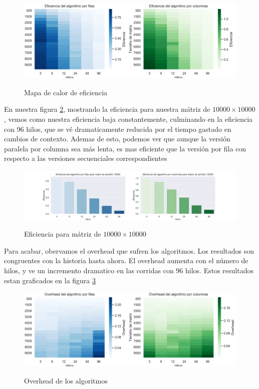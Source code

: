 \documentclass{report}
\begin{document}
\begin{figure}[H]
    \centering
  \caption{Mapa de calor de eficiencia}
\includegraphics[width=\textwidth]{stars_eff}
\label{fig:stareff}
\end{figure}

En nuestra figura \ref{fig:stareffbar}, mostrando la eficiencia para nuestra mátriz
de $10000 \times 10000$, vemos como nuestra eficiencia baja constantemente,
culminando en la eficiencia con 96 hilos, que se vé dramaticamente reducida por el
tiempo gastado en cambios de contexto. Ademas de esto, podemos ver que aunque la
versión paralela por columna sea más lenta, es mas eficiente que la versión por
fila con respecto a las versiones secuenciales correspondientes

\begin{figure}[H]
    \centering
  \caption{Eficiencia para mátriz de $10000 \times 10000$}
  \includegraphics[width=\textwidth]{stars_eff_bar}
\label{fig:stareffbar}
\end{figure}

Para acabar, obervamos el overhead que sufren los algoritmos. Los resultados
son congruentes con la historia hasta ahora. El overhead aumenta con el número de
hilos, y ve un incremento dramatico en las corridas con 96 hilos. Estos resultados
estan graficados en la figura \ref{fig:staroverhead}

\begin{figure}[H]
    \centering
  \caption{Overhead de los algoritmos}
\includegraphics[width=\textwidth]{stars_overhead}
\label{fig:staroverhead}
\end{figure}
\end{document}
